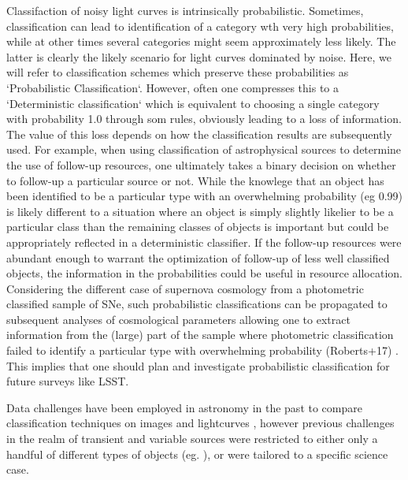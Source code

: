 Classifaction of noisy light curves is intrinsically probabilistic. Sometimes, classification can lead to identification of a category wth very high probabilities, while at other times several categories might seem approximately 
less likely. The latter is clearly the likely scenario for light curves dominated by noise.
Here, we will refer to classification schemes which preserve these probabilities as `Probabilistic Classification`.
However, often one compresses this to a  
 `Deterministic classification` which is equivalent to choosing a single category with probability 1.0 through som 
rules, obviously leading to a loss of information. The value of this loss depends on how the classification results are subsequently used. For example, when using classification of astrophysical sources to determine the use of follow-up resources, one ultimately takes a binary decision on whether to follow-up a particular source or not. While the knowlege that an object has been identified to be a particular type with an overwhelming probability (eg 0.99) is likely different to a situation where an object is simply slightly likelier to be a particular class than the remaining classes of objects is important but could be appropriately reflected in a deterministic classifier. If the follow-up resources were abundant enough to warrant the optimization of follow-up of less well classified objects,  the information in the probabilities could be useful in resource allocation. Considering the different case of supernova cosmology from a photometric classified sample of SNe, such probabilistic classifications can be propagated to subsequent analyses of cosmological parameters allowing one to extract information from the (large) part of the sample where photometric classification failed to identify a particular type with overwhelming probability (Roberts+17) . This implies that one should plan and investigate probabilistic classification for future surveys like LSST. 

Data challenges have been employed in astronomy in the past to compare classification techniques on images  and lightcurves , however previous challenges in the realm of transient and variable sources were restricted to either only a handful of different types of objects (eg. \snphotcc), or were tailored to a specific science case.

